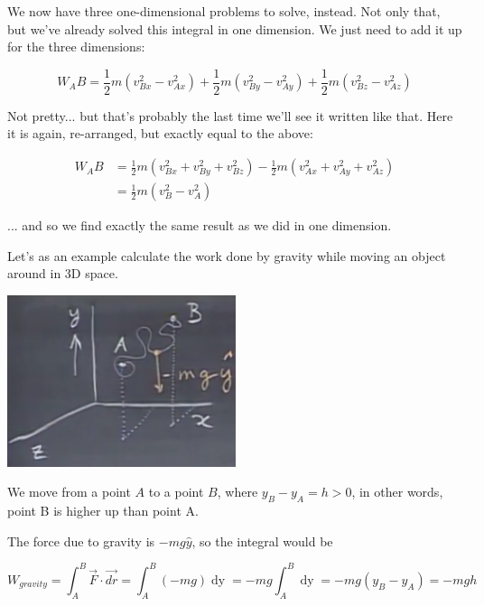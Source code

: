 \documentclass[12pt,a4paper]{report}
\begin{document}
We now have three one-dimensional problems to solve, instead. Not only that, but we've already solved this integral in one dimension. We just need to add it up for the three dimensions:

\begin{equation}
W_AB = \frac{1}{2} m \left( v_{Bx}^2 - v_{Ax}^2 \right) + \frac{1}{2} m \left( v_{By}^2 - v_{Ay}^2 \right) + \frac{1}{2} m \left( v_{Bz}^2 - v_{Az}^2 \right)
\end{equation}

Not pretty... but that's probably the last time we'll see it written like that. Here it is again, re-arranged, but exactly equal to the above:

\begin{align}
W_AB &= \frac{1}{2} m \left( v_{Bx}^2 + v_{By}^2 + v_{Bz}^2 \right) - \frac{1}{2}m  \left( v_{Ax}^2 + v_{Ay}^2 + v_{Az}^2 \right)\\
     &= \frac{1}{2} m \left( v_B^2 - v_A^2 \right)
\end{align}

... and so we find exactly the same result as we did in one dimension.

Let's as an example calculate the work done by gravity while moving an object around in 3D space.

\begin{center}
\includegraphics[scale=0.8]{Graphics/lec11_3d_path}
\end{center}

We move from a point $A$ to a point $B$, where $y_B - y_A = h > 0$, in other words, point B is higher up than point A.

The force due to gravity is $- m g \hat{y}$, so the integral would be

\begin{equation}
W_{gravity} = \int_A^B \vec{F} \cdot \vec{dr} = \int_A^B (- m g) \mathop{dy} = - m g \int_A^B \mathop{dy} = -m g(y_B - y_A) = -m g h
\end{equation}
\end{document}
